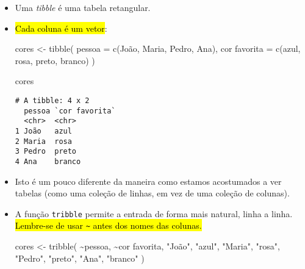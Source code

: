\documentclass[
  letterpaper,
  DIV=11,
  numbers=noendperiod]{scrreprt}
\newenvironment{Shaded}{\begin{snugshade}}{\end{snugshade}}
\newcommand{\AttributeTok}[1]{\textcolor[rgb]{0.40,0.45,0.13}{#1}}
\newcommand{\FunctionTok}[1]{\textcolor[rgb]{0.28,0.35,0.67}{#1}}
\newcommand{\NormalTok}[1]{\textcolor[rgb]{0.00,0.23,0.31}{#1}}
\newcommand{\OtherTok}[1]{\textcolor[rgb]{0.00,0.23,0.31}{#1}}
\newcommand{\SpecialCharTok}[1]{\textcolor[rgb]{0.37,0.37,0.37}{#1}}
\newcommand{\StringTok}[1]{\textcolor[rgb]{0.13,0.47,0.30}{#1}}
\begin{document}
\begin{itemize}
\item
  Uma \emph{tibble} é uma tabela retangular.
\item
  {\hl{Cada coluna é um vetor}}:

\begin{Shaded}
\begin{Highlighting}[]
\NormalTok{cores }\OtherTok{\textless{}{-}} \FunctionTok{tibble}\NormalTok{(}
  \AttributeTok{pessoa =} \FunctionTok{c}\NormalTok{(}\StringTok{\textquotesingle{}João\textquotesingle{}}\NormalTok{, }\StringTok{\textquotesingle{}Maria\textquotesingle{}}\NormalTok{, }\StringTok{\textquotesingle{}Pedro\textquotesingle{}}\NormalTok{, }\StringTok{\textquotesingle{}Ana\textquotesingle{}}\NormalTok{),}
  \StringTok{\textquotesingle{}cor favorita\textquotesingle{}} \OtherTok{=} \FunctionTok{c}\NormalTok{(}\StringTok{\textquotesingle{}azul\textquotesingle{}}\NormalTok{, }\StringTok{\textquotesingle{}rosa\textquotesingle{}}\NormalTok{, }\StringTok{\textquotesingle{}preto\textquotesingle{}}\NormalTok{, }\StringTok{\textquotesingle{}branco\textquotesingle{}}\NormalTok{)}
\NormalTok{)}
\end{Highlighting}
\end{Shaded}

\begin{Shaded}
\begin{Highlighting}[]
\NormalTok{cores}
\end{Highlighting}
\end{Shaded}

\begin{verbatim}
# A tibble: 4 x 2
  pessoa `cor favorita`
  <chr>  <chr>         
1 João   azul          
2 Maria  rosa          
3 Pedro  preto         
4 Ana    branco        
\end{verbatim}
\item
  Isto é um pouco diferente da maneira como estamos acostumados a ver
  tabelas (como uma coleção de linhas, em vez de uma coleção de
  colunas).
\item
  A função \texttt{tribble} permite a entrada de forma mais natural,
  linha a linha. {\hl{Lembre-se de usar
  {\mbox{\texttt{\textasciitilde{}}}} antes dos nomes das colunas.}}

\begin{Shaded}
\begin{Highlighting}[]
\NormalTok{cores }\OtherTok{\textless{}{-}} \FunctionTok{tribble}\NormalTok{(}
  \SpecialCharTok{\textasciitilde{}}\NormalTok{pessoa, }\SpecialCharTok{\textasciitilde{}}\StringTok{\textquotesingle{}cor favorita\textquotesingle{}}\NormalTok{,}
   \StringTok{"João"}\NormalTok{,          }\StringTok{"azul"}\NormalTok{,}
  \StringTok{"Maria"}\NormalTok{,          }\StringTok{"rosa"}\NormalTok{,}
  \StringTok{"Pedro"}\NormalTok{,         }\StringTok{"preto"}\NormalTok{,}
    \StringTok{"Ana"}\NormalTok{,        }\StringTok{"branco"}
\NormalTok{)}
\end{Highlighting}
\end{Shaded}


\end{itemize}
\end{document}
